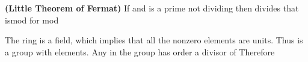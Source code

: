\documentclass[11pt,oneside]{article}
\begin{document}
\begin{BookBody}
 \textbf{(Little Theorem of Fermat)} If  and  is a prime not dividing  then  divides  that ismod  for mod 

 The ring  is a field, which implies that all the nonzero elements are units. Thus  is a group with  elements. Any  in the group  has order a divisor of   Therefore

\end{BookBody}

\BookNarrativetrue
\end{document}
